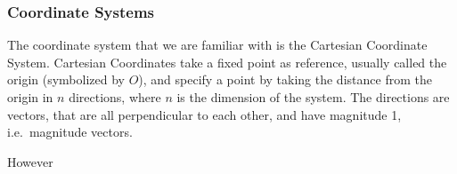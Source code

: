 \documentclass[../../../../../../main.tex]{subfiles}
\begin{document}
\subsubsection{Coordinate Systems}
The coordinate system that we are familiar with is the Cartesian Coordinate System. Cartesian Coordinates take a fixed point as reference, usually called the origin (symbolized by $O$), and specify a point by taking the distance from the origin in $n$ directions, where $n$ is the dimension of the system. The directions are vectors, that are all perpendicular to each other, and have magnitude 1, i.e.\ magnitude vectors.

However 

\newpage 
\end{document}
